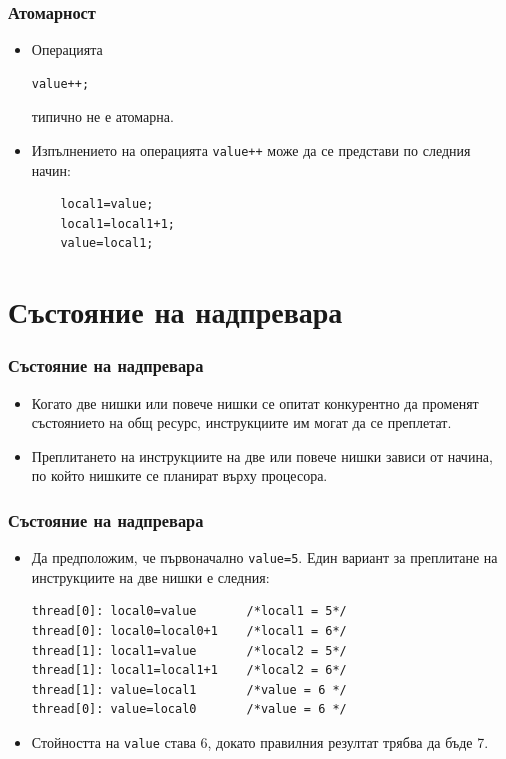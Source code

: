 \documentclass[ignorenonframetext, hyperref=unicode,compress]{beamer}
\begin{document}
\begin{frame}[containsverbatim]
\frametitle{Атомарност}
\begin{itemize}
  \item Операцията
  \begin{lstlisting}[numbers=none]
	value++;
  \end{lstlisting}
  типично не е атомарна.
  \item Изпълнението на операцията \lstinline{value++} може да се представи по
  следния начин:
\begin{lstlisting}
	local1=value;
	local1=local1+1;
	value=local1;
\end{lstlisting}
\end{itemize}
\end{frame}

\section{Състояние на надпревара}
\begin{frame}[containsverbatim]
\frametitle{Състояние на надпревара}
\begin{itemize}
  \item Когато две нишки или повече нишки се опитат конкурентно да променят
  състоянието на общ ресурс, инструкциите им могат да се преплетат.
  \item Преплитането на инструкциите на две или повече нишки зависи от
  начина, по който нишките се планират върху процесора.
\end{itemize}
\end{frame}

\begin{frame}[containsverbatim]
\frametitle{Състояние на надпревара}
\begin{itemize}
\item Да предположим, че първоначално \lstinline{value=5}. Един вариант за
преплитане на инструкциите на две нишки е следния:
\begin{lstlisting}
thread[0]: local0=value       /*local1 = 5*/
thread[0]: local0=local0+1    /*local1 = 6*/
thread[1]: local1=value       /*local2 = 5*/
thread[1]: local1=local1+1    /*local2 = 6*/
thread[1]: value=local1       /*value = 6 */
thread[0]: value=local0       /*value = 6 */
\end{lstlisting}
\item Стойността на \lstinline{value} става 6, докато правилния
резултат трябва да бъде 7.
\end{itemize}
\end{frame}
\end{document}
